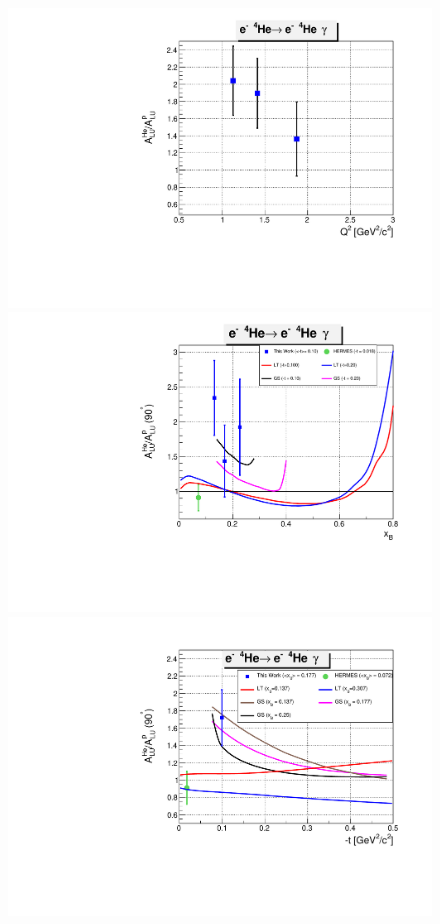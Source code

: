 \begin{figure}[tp]
\centering
\includegraphics[scale=0.38]{fig_updated/BSA_ratio_coh_Q2.pdf}\\
\includegraphics[scale=0.38]{fig_updated/BSA_ratio_coh_xB.pdf}\\
\includegraphics[scale=0.38]{fig_updated/BSA_ratio_coh_t.pdf}

\end{figure}
